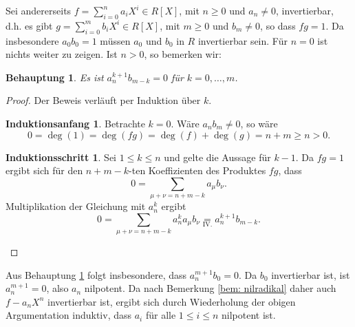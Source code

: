 \documentclass[a4paper,10pt]{article}
\newcounter{satze}
\newtheorem{beh}[satze]{Behauptung}
\theoremstyle{definition}
\newtheorem*{ia}{Induktionsanfang}
\newtheorem*{is}{Induktionsschritt}
\begin{document}
Sei andererseits $f = \sum_{i=0}^n a_i X^i \in R[X]$, mit $n \geq 0$ und $a_n \neq 0$, invertierbar, d.h. es gibt $g = \sum_{i=0}^m b_i X^i \in R[X]$, mit $m \geq 0$ und $b_m \neq 0$, so dass $fg = 1$. Da insbesondere $a_0 b_0 = 1$ müssen $a_0$ und $b_0$ in $R$ invertierbar sein. Für $n=0$ ist nichts weiter zu zeigen. Ist $n > 0$, so bemerken wir:

\begin{beh}\label{beh: a_n nilpotent}
 Es ist $a_n^{k+1} b_{m-k} = 0$ für $k=0,\ldots,m$.
\end{beh}
\begin{proof}
 Der Beweis verläuft per Induktion über $k$.
 \begin{ia}Betrachte $k=0$. Wäre $a_n b_m \neq 0$, so wäre
  \[
   0 = \deg(1) = \deg(fg) = \deg(f)+\deg(g) = n+m \geq n > 0.
  \]
 \end{ia}
 \begin{is}
 Sei $1 \leq k \leq n$ und gelte die Aussage für $k-1$. Da $fg = 1$ ergibt sich für den $n+m-k$-ten Koeffizienten des Produktes $fg$, dass
 \[
  0 = \sum_{\mu+\nu = n+m-k} a_\mu b_\nu.
 \]
 Multiplikation der Gleichung mit $a_n^k$ ergibt
 \[
  0 = \sum_{\mu+\nu = n+m-k} a_n^k a_\mu b_\nu \underset{\text{IV.}}= a_n^{k+1} b_{m-k}.
 \]
 \end{is}
\end{proof}
Aus Behauptung \ref{beh: a_n nilpotent} folgt insbesondere, dass $a_n^{m+1} b_0 = 0$. Da $b_0$ invertierbar ist, ist $a_n^{m+1} = 0$, also $a_n$ nilpotent. Da nach Bemerkung \ref{bem: nilradikal} daher auch $f- a_n X^n$ invertierbar ist, ergibt sich durch Wiederholung der obigen Argumentation induktiv, dass $a_i$ für alle $1 \leq i \leq n$ nilpotent ist.





\section{}
\end{document}
